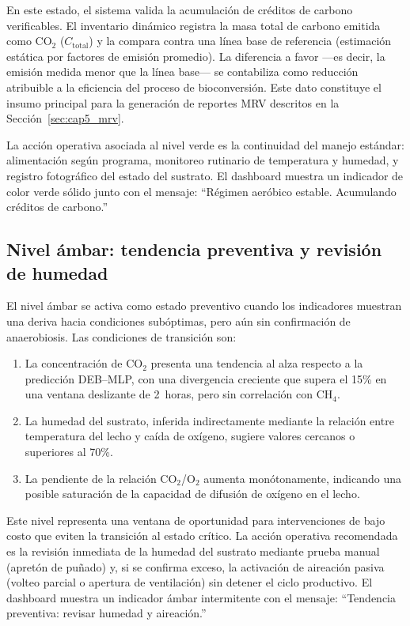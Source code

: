 En este estado, el sistema valida la acumulación de créditos de carbono verificables. El inventario dinámico registra la masa total de carbono emitida como CO$_2$ ($C_{\mathrm{total}}$) y la compara contra una línea base de referencia (estimación estática por factores de emisión promedio). La diferencia a favor ---es decir, la emisión medida menor que la línea base--- se contabiliza como reducción atribuible a la eficiencia del proceso de bioconversión. Este dato constituye el insumo principal para la generación de reportes MRV descritos en la Sección~\ref{sec:cap5_mrv}.

La acción operativa asociada al nivel verde es la continuidad del manejo estándar: alimentación según programa, monitoreo rutinario de temperatura y humedad, y registro fotográfico del estado del sustrato. El dashboard muestra un indicador de color verde sólido junto con el mensaje: ``Régimen aeróbico estable. Acumulando créditos de carbono.''

\subsection{Nivel ámbar: tendencia preventiva y revisión de humedad}
\label{subsec:cap5_ambar}

El nivel ámbar se activa como estado preventivo cuando los indicadores muestran una deriva hacia condiciones subóptimas, pero aún sin confirmación de anaerobiosis. Las condiciones de transición son:

\begin{enumerate}
    \item La concentración de CO$_2$ presenta una tendencia al alza respecto a la predicción DEB--MLP, con una divergencia creciente que supera el 15\% en una ventana deslizante de 2~horas, pero sin correlación con CH$_4$.
    \item La humedad del sustrato, inferida indirectamente mediante la relación entre temperatura del lecho y caída de oxígeno, sugiere valores cercanos o superiores al 70\%.
    \item La pendiente de la relación CO$_2$/O$_2$ aumenta monótonamente, indicando una posible saturación de la capacidad de difusión de oxígeno en el lecho.
\end{enumerate}

Este nivel representa una ventana de oportunidad para intervenciones de bajo costo que eviten la transición al estado crítico. La acción operativa recomendada es la revisión inmediata de la humedad del sustrato mediante prueba manual (apretón de puñado) y, si se confirma exceso, la activación de aireación pasiva (volteo parcial o apertura de ventilación) sin detener el ciclo productivo. El dashboard muestra un indicador ámbar intermitente con el mensaje: ``Tendencia preventiva: revisar humedad y aireación.''

